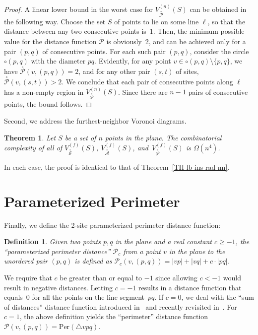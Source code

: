 \documentclass[10pt, conference, compsocconf]{IEEEtran}
\newtheorem{theorem}{Theorem}
\newtheorem{definition}{Definition}
\def\PP{{\mathcal P}}
\def\XA{{\stackrel{\circ}{\mathcal A}}}
\def\XP{{\stackrel{\circ}{\mathcal P}}}
\def\XS{{\stackrel{\circ}{\mathcal S}}}
\begin{document}
\begin{proof}
   A linear lower bound in the worst case for $V_\XP^{(n)}(S)$ can be
   obtained in the following way.  Choose the set $S$ of points to lie on
   some line $\ell$, so that the distance between any two consecutive
   points is~1. Then, the minimum possible value for the distance function
   $\XP$ is obviously~2, and can be achieved only for a pair $(p,q)$ of
   consecutive points.  For each such pair $(p,q)$, consider the circle
   $\circ(p,q)$ with the diameter $pq$.  Evidently,
   for any point $v \in \circ(p,q) \setminus \{p,q\}$, we have
   $\XP(v,(p,q)) = 2$, and for any other pair $(s,t)$ of sites,
   $\XP(v,(s,t)) > 2$.  We conclude that each pair of consecutive points
   along $\ell$ has a non-empty region in $V_\XP^{(n)}(S)$.  Since there
   are $n-1$ pairs of consecutive points, the bound follows.
\end{proof}

Second, we address the furthest-neighbor Voronoi diagrams.

\begin{theorem}
   Let $S$ be a set of $n$ points in the plane.
   The combinatorial complexity of all of $V_\XS^{(f)}(S)$,
   $V_\XA^{(f)}(S)$, and~$V_\XP^{(f)}(S)$ is $\Omega(n^4)$.
\end{theorem}

In each case, the proof is identical to that of
Theorem~\ref{TH-lb-ins-rad-nn}.



\section{Parameterized Perimeter}

Finally, we define the 2-site parameterized perimeter distance function:
\begin{definition}
   Given two points $p,q$ in the plane and a real constant $c \geq -1$,
   the ``parameterized perimeter distance'' $\PP_c$ from a point $v$ in
   the plane to the unordered pair $(p,q)$ is
   defined as $\PP_c(v,(p,q)) = |vp|+|vq|+c\cdot |pq|$.
\end{definition}

We require that $c$ be greater than or equal to $-1$ since allowing
$c < -1$ would result in negative distances.  Letting $c=-1$ results in a
distance function that equals~0 for all the points on the line segment~$pq$.
 If $c=0$, we deal with the ``sum of distances'' distance function
introduced in~\cite{BDD02} and recently revisited in~\cite{VB10}.
For $c=1$, the above definition yields the ``perimeter'' distance function
$\PP(v,(p,q)) = \mathrm{Per}(\triangle vpq)$.
\end{document}

